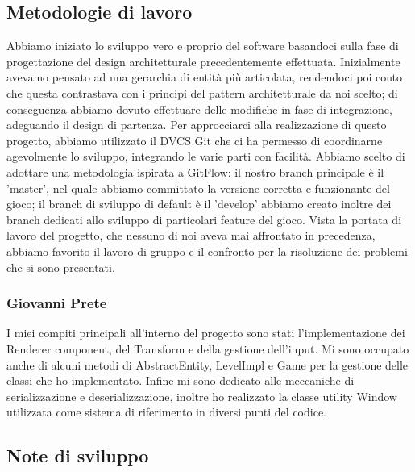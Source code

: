 \documentclass{article}
\begin{document}
\subsection{Metodologie di lavoro}
Abbiamo iniziato lo sviluppo vero e proprio del software basandoci sulla fase di progettazione del design architetturale precedentemente effettuata. Inizialmente avevamo pensato ad una gerarchia di entità più articolata, rendendoci poi conto che questa contrastava con i principi del pattern architetturale da noi scelto; di conseguenza abbiamo dovuto effettuare delle modifiche in fase di integrazione, adeguando il design di partenza.
Per approcciarci alla realizzazione di questo progetto, abbiamo utilizzato il DVCS Git che ci ha permesso di coordinarne agevolmente lo sviluppo, integrando le varie parti con facilità. Abbiamo scelto di adottare una metodologia ispirata a GitFlow: il nostro branch principale è il 'master', nel quale abbiamo committato la versione corretta e funzionante del gioco; il branch di sviluppo di default è il 'develop' abbiamo creato inoltre dei branch dedicati allo sviluppo di particolari feature del gioco. 
Vista la portata di lavoro del progetto, che nessuno di noi aveva mai affrontato in precedenza, abbiamo favorito il lavoro di gruppo e il confronto per la risoluzione dei problemi che si sono presentati.
\subsubsection{Giovanni Prete}
I miei compiti principali all'interno del progetto sono stati
l'implementazione dei Renderer component, del Transform e della gestione dell'input. Mi sono occupato anche di alcuni metodi di AbstractEntity, LevelImpl e Game per la gestione delle classi che ho implementato. Infine mi sono dedicato alle meccaniche di serializzazione e deserializzazione, inoltre ho realizzato la classe utility Window utilizzata come sistema di riferimento in diversi punti del codice.\\

\subsection{Note di sviluppo}
\end{document}
